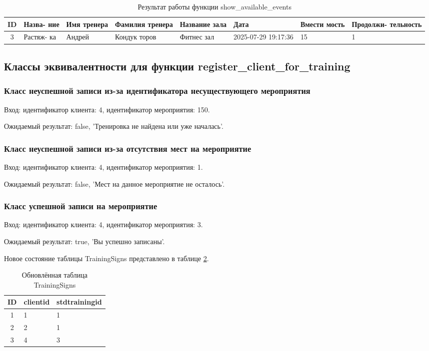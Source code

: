\begin{table}[H]
	\centering
	\caption{Результат работы функции show\_available\_events}
	\begin{tabular}{|c|p{1.7cm}|p{2cm}|p{2cm}|p{2cm}|p{1.6cm}|p{1.5cm}|p{2.3cm}|}
	\hline
	ID & Назва- ние & Имя тренера & Фамилия тренера & Название зала & Дата & Вмести мость & Продолжи- тельность \\
	\hline
	3 & Растяж- ка & Андрей & Кондук торов & Фитнес зал & 2025-07-29 19:17:36 & 15 & 1 \\
	\hline
	\end{tabular}
	\label{tab:res_class_2}
\end{table}

\subsection{Классы эквивалентности для функции register\_client\_for\_training}

\subsubsection{Класс неуспешной записи из-за идентификатора несуществующего мероприятия}

Вход: идентификатор клиента: 4, идентификатор мероприятия: 150.

Ожидаемый результат: false, 'Тренировка не найдена или уже началась'.

\subsubsection{Класс неуспешной записи из-за отсутствия мест на мероприятие}

Вход: идентификатор клиента: 4, идентификатор мероприятия: 1.

Ожидаемый результат: false, 'Мест на данное мероприятие не осталось'.

\subsubsection{Класс успешной записи на мероприятие}

Вход: идентификатор клиента: 4, идентификатор мероприятия: 3.

Ожидаемый результат: true, 'Вы успешно записаны'.

Новое состояние таблицы TrainingSigns представлено в таблице \ref{tab:new_trainingsigns}.

\begin{table}[H]
	\centering
	\caption{Обновлённая таблица TrainingSigns}
	\begin{tabular}{|c|p{7.5cm}|p{7.5cm}|}
	\hline
	ID & clientid & stdtrainingid \\
	\hline
	1 & 1 & 1 \\
	\hline
	2 & 2 & 1 \\
	\hline
	3 & 4 & 3 \\
	\hline
	\end{tabular}
	\label{tab:new_trainingsigns}
\end{table}

